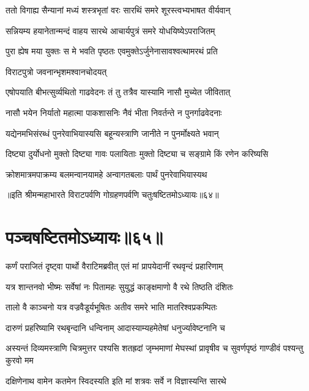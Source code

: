 \twolineshloka
{ततो विगाह्य सैन्यानां मध्यं शस्त्रभृतां वरः}
{सारथिं समरे शूरस्त्वभ्यभाषत वीर्यवान्}


\twolineshloka
{सन्नियम्य हयानेतान्मन्दं वाहय सारथे}
{आचार्यपुत्रं समरे योधयिष्येऽपराजितम्}


\twolineshloka
{पुरा ह्येष मया युक्तः स मे भवति पृष्ठतः}
{एवमुक्तेऽर्जुनेनासावश्वत्थामरथं प्रति}


\onelineshloka
{विराटपुत्रो जवनान्भृशमश्वानचोदयत्}




\twolineshloka
{एषोपयाति बीभत्सुर्व्यथितो गाढवेदनः}
{तं तु तत्रैव यास्यामि नासौ मुच्येत जीवितात्}




\twolineshloka
{नासौ भयेन निर्यातो महात्मा पाकशासनिः}
{नैवं भीता निवर्तन्ते न पुनर्गाढवेदनाः}


\twolineshloka
{यद्येनमभिसंरब्धं पुनरेवाभियास्यसि}
{बहून्यस्त्राणि जानीते न पुनर्मोक्ष्यते भवान्}


\twolineshloka
{दिष्ट्या दुर्योधनो मुक्तो दिष्ट्या गावः पलायिताः}
{मुक्तो दिष्ट्या च सङ्ग्रामे किं रणेन करिष्यसि}


\twolineshloka
{क्रोशमात्रमपाक्रम्य बलमन्वानयामहे}
{अन्वागतबलाः पार्थं पुनरेवाभियास्यथ}

॥इति श्रीमन्महाभारते विराटपर्वणि गोग्रहणपर्वणि चतुःषष्टितमोऽध्यायः॥६४॥

\chapter{पञ्चषष्टितमोऽध्यायः॥६५॥}

\twolineshloka
{कर्णं पराजितं दृष्ट्वा पार्थो वैराटिमब्रवीत्}
{एतं मां प्रापयेदानीं रथवृन्दं प्रहारिणाम्}


\twolineshloka
{यत्र शान्तनवो भीष्मः सर्वेषां नः पितामहः}
{सुयुद्धं काङ्क्षमाणो वै रथे तिष्ठति दंशितः}


\twolineshloka
{तालो वै काञ्चनो यत्र वज्रवैडूर्यभूषितः}
{अतीव समरे भाति मातरिश्वप्रकम्पितः}


\twolineshloka
{दारुणं प्रहरिष्यामि रथबृन्दानि धन्विनाम्}
{आदास्याम्यहमेतेषां धनुर्ज्यावेष्टनानि च}


\onelineshloka
{अस्यन्तं दिव्यमस्त्राणि चित्रमुत्तर पश्यसि}
\twolineshloka
{शतह्रदां जृम्भमाणां मेघस्थां प्रावृषीव च}
{सुवर्णपृष्ठं गाण्डीवं पश्यन्तु कुरवो मम}


\twolineshloka
{दक्षिणेनाथ वामेन कतमेन स्विदस्यति}
{इति मां शत्रवः सर्वे न विज्ञास्यन्ति सारथे}


